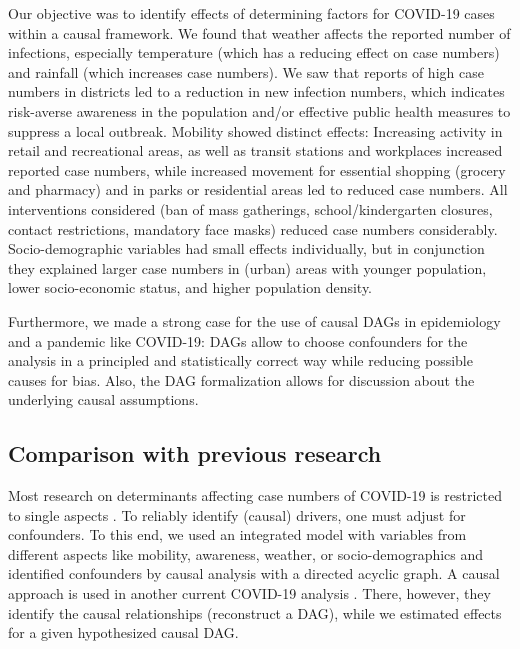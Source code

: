 \documentclass[]{elsarticle} %
\begin{document}
Our objective was to identify effects of determining factors for COVID-19 cases within a causal framework. We found that weather affects the reported number of infections, especially temperature (which has a reducing effect on case numbers) and rainfall (which increases case numbers). We saw that reports of high case numbers in districts led to a reduction in new infection numbers, which indicates risk-averse awareness in the population and/or effective public health measures to suppress a local outbreak. Mobility showed distinct effects: Increasing activity in retail and recreational areas, as well as transit stations and workplaces increased reported case numbers, while increased movement for essential shopping (grocery and pharmacy) and in parks or residential areas led to reduced case numbers. All interventions considered (ban of mass gatherings, school/kindergarten closures, contact restrictions, mandatory face masks) reduced case numbers considerably. Socio-demographic variables had small effects individually, but in conjunction they explained larger case numbers in (urban) areas with younger population, lower socio-economic status, and higher population density.

Furthermore, we made a strong case for the use of causal DAGs in epidemiology and a pandemic like COVID-19: DAGs allow to choose confounders for the analysis in a principled and statistically correct way while reducing possible causes for bias. Also, the DAG formalization allows for discussion about the underlying causal assumptions.

\hypertarget{comparison-with-previous-research}{%
\subsection{Comparison with previous research}\label{comparison-with-previous-research}}

Most research on determinants affecting case numbers of COVID-19 is restricted to single aspects \citep{fowler_effect_2020, li_retrospective_2020, shi_impact_2020, Wang2020temperature}. To reliably identify (causal) drivers, one must adjust for confounders. To this end, we used an integrated model with variables from different aspects like mobility, awareness, weather, or socio-demographics and identified confounders by causal analysis with a directed acyclic graph. A causal approach is used in another current COVID-19 analysis \citep{gencoglu2020causal}. There, however, they identify the causal relationships (reconstruct a DAG), while we estimated effects for a given hypothesized causal DAG.
\end{document}
